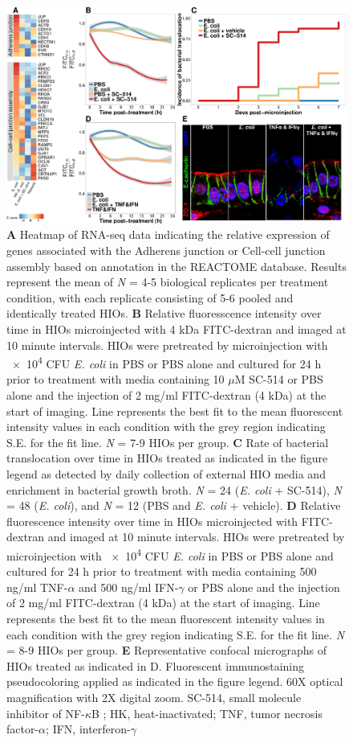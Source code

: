 \documentclass[9pt,lineo]{elife}
\begin{document}
\begin{figure}
\begin{fullwidth}
\centering
\includegraphics[width=0.95\linewidth]{./figures/figure8/figure8_multipanel.png}
\caption{\textbf{A} Heatmap of RNA-seq data indicating the relative expression of genes associated with the Adherens junction or Cell-cell junction assembly based on annotation in the REACTOME database. Results represent the mean of \textit{N} = 4-5 biological replicates per treatment condition, with each replicate consisting of 5-6 pooled and identically treated HIOs. \textbf{B} Relative fluoresscence intensity over time in HIOs microinjected with 4 kDa FITC-dextran and imaged at 10 minute intervals. HIOs were pretreated by microinjection with \num{e4} CFU \textit{E. coli} in PBS or PBS alone and cultured for 24 h prior to treatment with media containing 10 $\mu$M SC-514 or PBS alone and the injection of 2 mg/ml FITC-dextran (4 kDa) at the start of imaging.  Line represents the best fit to the mean fluorescent intensity values in each condition with the grey region indicating S.E. for the fit line. \textit{N} = 7-9 HIOs per group. \textbf{C} Rate of bacterial translocation over time in HIOs treated as indicated in the figure legend as detected by daily collection of external HIO media and enrichment in bacterial growth broth. \textit{N} = 24 (\textit{E. coli} + SC-514), \textit{N} = 48 (\textit{E. coli}), and \textit{N} = 12 (PBS and \textit{E. coli} + vehicle). \textbf{D} Relative fluorescence intensity over time in HIOs microinjected with FITC-dextran and imaged at 10 minute intervals. HIOs were pretreated by microinjection with \num{e4} CFU \textit{E. coli} in PBS or PBS alone and cultured for 24 h prior to treatment with media containing 500 ng/ml TNF-$\alpha$ and 500 ng/ml IFN-$\gamma$ or PBS alone and the injection of 2 mg/ml FITC-dextran (4 kDa) at the start of imaging. Line represents the best fit to the mean fluorescent intensity values in each condition with the grey region indicating S.E. for the fit line. \textit{N} = 8-9 HIOs per group. \textbf{E} Representative confocal micrographs of HIOs treated as indicated in D. Fluorescent immunostaining pseudocoloring applied as indicated in the figure legend. 60X optical magnification with 2X digital zoom. SC-514, small molecule inhibitor of NF-$\kappa$B ; HK, heat-inactivated; TNF, tumor necrosis factor-$\alpha$; IFN, interferon-$\gamma$}
\label{fig:fullwidth}
\end{fullwidth}
\end{figure}
\end{document}
